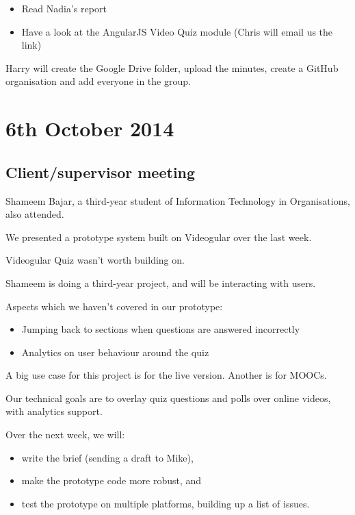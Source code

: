 \begin{itemize}
\itemsep1pt\parskip0pt
\item
  Read Nadia's report
\item
  Have a look at the AngularJS Video Quiz module (Chris will email us the link)
\end{itemize}

Harry will create the Google Drive folder, upload the minutes, create a
GitHub organisation and add everyone in the group.

\section{6th October 2014}\label{Minutes:2014-10-06}

\subsection{Client/supervisor meeting}

Shameem Bajar, a third-year student of Information Technology in
Organisations, also attended.

We presented a prototype system built on Videogular over the last week.

Videogular Quiz wasn't worth building on.

Shameem is doing a third-year project, and will be interacting with
users.

Aspects which we haven't covered in our prototype:

\begin{itemize}
\itemsep1pt\parskip0pt
\item
  Jumping back to sections when questions are answered incorrectly
\item
  Analytics on user behaviour around the quiz
\end{itemize}

A big use case for this project is for the live version. Another is for
MOOCs.

Our technical goals are to overlay quiz questions and polls over online
videos, with analytics support.

Over the next week, we will:

\begin{itemize}
\itemsep1pt\parskip0pt
\item
  write the brief (sending a draft to Mike),
\item
  make the prototype code more robust, and
\item
  test the prototype on multiple platforms, building up a list of
  issues.
\end{itemize}


